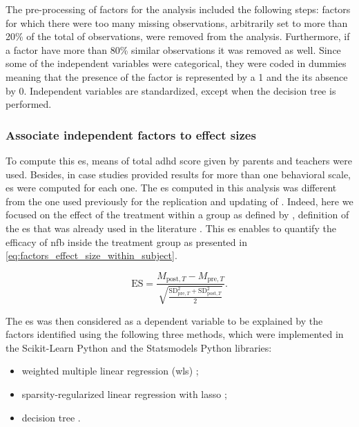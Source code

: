 The pre-processing of factors for the analysis included the following steps: factors for which there were too many missing observations, 
arbitrarily set to more than 20\% of the total of observations, were removed from the analysis. Furthermore, if a factor have more than 
80\% similar observations it was removed as well. Since some of the independent variables were categorical, they were coded in dummies
meaning that the presence of the factor is represented by a 1 and the its absence by 0. Independent variables are standardized, 
except when the decision tree is performed. 

\subsubsection{Associate independent factors to effect sizes}

To compute this \gls{es}, means of total \gls{adhd} score given by parents and teachers were used. Besides, in case studies provided results 
for more than one behavioral scale, \gls{es} were computed for each one. The \gls{es} computed in this analysis was different from the one 
used previously for the replication and updating of \citet{Cortese2016}. Indeed, here we focused on the effect of the treatment within 
a group as defined by \citet{Cohen1988}, definition of the \gls{es} that was already used in the literature \citep{Arns2009, Maurizio2014, 
Strehl2017}. This \gls{es} enables to quantify the efficacy of \gls{nfb} inside the treatment group as presented in \cref{eq:factors_effect_size_within_subject}.

\begin{equation}
\label{eq:factors_effect_size_within_subject}
\text{ES} = \frac{M_{\text{post},T} - M_{\text{pre},T}}  { \sqrt{ \frac{\text{SD}_{\text{pre},T}^2 + \text{SD}_{\text{post},T}^2 } {2} } }.
\end{equation} 

The \gls{es} was then considered as a dependent variable to be explained by the factors identified using the following three methods, which were 
implemented in the Scikit-Learn Python \citep{Pedregosa2011} and the Statsmodels Python\citep{Seabold2010} libraries:
\begin{itemize}
	\item weighted multiple linear regression (\gls{wls}) \citep{Montgomery2012}; 
	\item sparsity-regularized linear regression with \gls{lasso} \citep{Tibshirani1996};
	\item decision tree \citep{Quinlan1986}.
\end{itemize}

